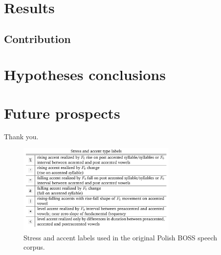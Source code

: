 \documentclass[a4paper,9pt]{beamer}
\theoremstyle{mytheoremstyle}
\begin{document}
\section{Results}

\subsection{Contribution}

\section{Hypotheses conclusions}



\section{Future prospects}

\begin{frame}

\begin{center}
Thank you.
\end{center}
\end{frame}











\begin{frame}
\begin{figure}
\begin{center}
  \includegraphics[width=0.7\textwidth]{res/stress_accent_labels}
\end{center}
	\caption{Stress and accent labels used in the original Polish BOSS speech corpus.}
\end{figure}
\end{frame}
\end{document}
